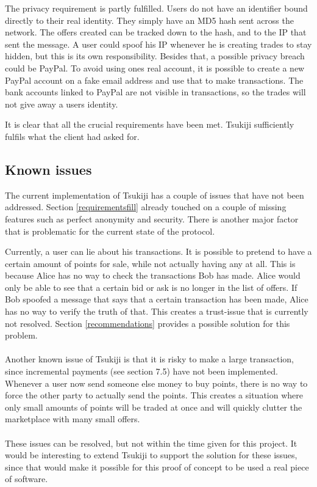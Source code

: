 The privacy requirement is partly fulfilled.
Users do not have an identifier bound directly to their real identity.
They simply have an MD5 hash sent across the network.
The offers created can be tracked down to the hash, and to the IP that sent the message.
A user could spoof his IP whenever he is creating trades to stay hidden, but this is its own responsibility.
Besides that, a possible privacy breach could be PayPal.
To avoid using ones real account, it is possible to create a new PayPal account on a fake email address and use that to make transactions.
The bank accounts linked to PayPal are not visible in transactions, so the trades will not give away a users identity.

It is clear that all the crucial requirements have been met.
Tsukiji sufficiently fulfils what the client had asked for.

\subsection{Known issues}
\label{knownissues}
The current implementation of Tsukiji has a couple of issues that have not been addressed.
Section \ref{requirementsfill} already touched on a couple of missing features such as perfect anonymity and security.
There is another major factor that is problematic for the current state of the protocol.

Currently, a user can lie about his transactions.
It is possible to pretend to have a certain amount of points for sale, while not actually having any at all.
This is because Alice has no way to check the transactions Bob has made.
Alice would only be able to see that a certain bid or ask is no longer in the list of offers.
If Bob spoofed a message that says that a certain transaction has been made, Alice has no way to verify the truth of that.
This creates a trust-issue that is currently not resolved.
Section \ref{recommendations} provides a possible solution for this problem.\\
\\
Another known issue of Tsukiji is that it is risky to make a large transaction, since incremental payments (see section 7.5) have not been implemented.
Whenever a user now send someone else money to buy points, there is no way to force the other party to actually send the points.
This creates a situation where only small amounts of points will be traded at once and will quickly clutter the marketplace with many small offers.\\
\\
These issues can be resolved, but not within the time given for this project.
It would be interesting to extend Tsukiji to support the solution for these issues, since that would make it possible for this proof of concept to be used a real piece of software.


